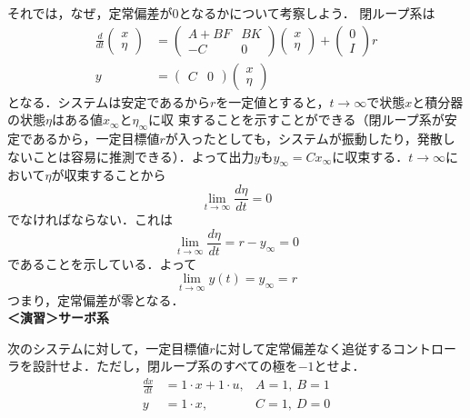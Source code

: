 それでは，なぜ，定常偏差が$0$となるかについて考察しよう．
閉ループ系は
\begin{align}
 \frac{d}{dt}
  \left(\begin{array}{c}
         x \\
	 \eta
	\end{array}\right)
  &=
  \left(\begin{array}{cc}
         A + B F & B K \\
	 - C     & 0
	\end{array}\right)
  \left(\begin{array}{c}
         x \\
	 \eta
	\end{array}\right)
  +
  \left(\begin{array}{c}
         0 \\
	 I
	\end{array}\right) 
  r \\
 y &=
  \left(\begin{array}{cc}
         C & 0 
	\end{array}\right)
  \left(\begin{array}{c}
         x \\
	 \eta
	\end{array}\right)
\end{align}
となる．システムは安定であるから$r$を一定値とすると，$t \rightarrow \infty
$で状態$x$と積分器の状態$\eta$はある値$x_{\infty}$と$\eta_{\infty}$に収
束することを示すことができる（閉ループ系が安定であるから，一定目標値$r$が入ったとしても，システムが振動したり，発散しないことは容易に推測できる）．よって出力$y$も$y_{\infty} = C x_{\infty}$に収束する．$t
\rightarrow \infty $において$\eta$が収束することから
\begin{equation}
 \lim_{t \rightarrow \infty} \frac{d \eta}{dt} = 0
\end{equation}
でなければならない．これは
\begin{equation}
 \lim_{t \rightarrow \infty} \frac{d \eta}{dt}
  = r - y_{\infty} = 0
\end{equation}
であることを示している．よって
\begin{equation}
   \lim_{t \rightarrow \infty} y(t) = y_\infty= r
\end{equation}
つまり，定常偏差が零となる．
\\

\noindent
{\bf ＜演習＞サーボ系} \nopagebreak

次のシステムに対して，一定目標値$r$に対して定常偏差なく追従するコントローラを設計せよ．ただし，閉ループ系のすべての極を$-1$とせよ．
\begin{align*}
	\frac{dx}{dt} &= 1 \cdot x + 1 \cdot u, \hspace{0cm} &A=1,\  B=1
\\
	y &= 1 \cdot x , &C=1, \ D=0
\end{align*}

